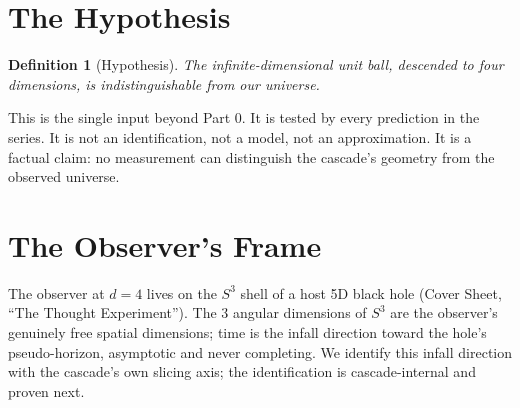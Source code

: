 \documentclass[11pt,a4paper]{article}
\newtheorem{definition}[theorem]{Definition}
\begin{document}
\begin{abstract}
Every factor is a cascade-native sphere-area ratio: the six sphere
areas $\Omega_2$, $\Omega_3$, $\Omega_5$, $\Omega_7$, $\Omega_{19}$,
$\Omega_{217}$, with zero imported objects. The QFT comparison in Section~\ref{sec:qft-comparison}
traces the ``$10^{120}$ cosmological constant problem'' to three
structural disagreements: (i) the number of free dimensions at the
observer's frame (4 for QFT, 3 for the cascade, because time is
locked), (ii) continuous vs discrete mode spectrum, and
(iii) hand-imposed UV cutoff vs Gamma-function terminus.
\end{abstract}

\section{The Hypothesis}

\begin{definition}[Hypothesis]\label{def:hyp}
The infinite-dimensional unit ball, descended to four dimensions, is
indistinguishable from our universe.
\end{definition}

This is the single input beyond Part 0. It is tested by every prediction
in the series. It is not an identification, not a model, not an
approximation. It is a factual claim: no measurement can distinguish the
cascade's geometry from the observed universe.

\section{The Observer's Frame}\label{sec:observer}

The observer at $d = 4$ lives on the $S^3$ shell of a host 5D black
hole (Cover Sheet, ``The Thought Experiment''). The 3 angular
dimensions of $S^3$ are the observer's genuinely free spatial
dimensions; time is the infall direction toward the hole's
pseudo-horizon, asymptotic and never completing. We identify this
infall direction with the cascade's own slicing axis; the
identification is cascade-internal and proven next.
\end{document}
